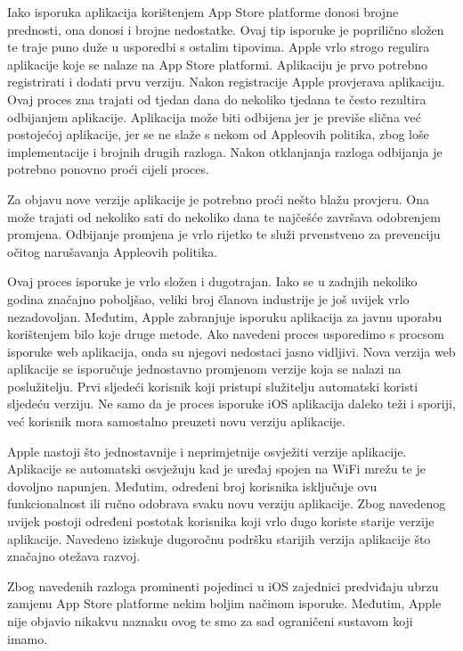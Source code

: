 \documentclass[times, utf8, diplomski, numeric]{fer}
\begin{document}
Iako isporuka aplikacija korištenjem App Store platforme donosi brojne prednosti, ona donosi i brojne nedostatke. Ovaj tip isporuke je poprilično složen te traje puno duže u usporedbi s ostalim tipovima. Apple vrlo strogo regulira aplikacije koje se nalaze na App Store platformi. Aplikaciju je prvo potrebno registrirati i dodati prvu verziju. Nakon registracije Apple provjerava aplikaciju. Ovaj proces zna trajati od tjedan dana do nekoliko tjedana te često rezultira odbijanjem aplikacije. Aplikacija može biti odbijena jer je previše slična već postojećoj aplikacije, jer se ne slaže s nekom od Appleovih politika, zbog loše implementacije i brojnih drugih razloga. Nakon otklanjanja razloga odbijanja je potrebno ponovno proći cijeli proces.

Za objavu nove verzije aplikacije je potrebno proći nešto blažu provjeru. Ona može trajati od nekoliko sati do nekoliko dana te najčešće završava odobrenjem promjena. Odbijanje promjena je vrlo rijetko te služi prvenstveno za prevenciju očitog narušavanja Appleovih politika.

Ovaj proces isporuke je vrlo složen i dugotrajan. Iako se u zadnjih nekoliko godina značajno poboljšao, veliki broj članova industrije je još uvijek vrlo nezadovoljan. Međutim, Apple zabranjuje isporuku aplikacija za javnu uporabu korištenjem bilo koje druge metode. Ako navedeni proces usporedimo s procsom isporuke web aplikacija, onda su njegovi nedostaci jasno vidljivi. Nova verzija web aplikacije se isporučuje jednostavno promjenom verzije koja se nalazi na poslužitelju. Prvi sljedeći korisnik koji pristupi služitelju automatski koristi sljedeću verziju. Ne samo da je proces isporuke iOS aplikacija daleko teži i sporiji, već korisnik mora samostalno preuzeti novu verziju aplikacije.

Apple nastoji što jednostavnije i neprimjetnije osvježiti verzije aplikacije. Aplikacije se automatski osvježuju kad je uređaj spojen na WiFi mrežu te je dovoljno napunjen. Međutim, određeni broj korisnika isključuje ovu funkcionalnost ili ručno odobrava svaku novu verziju aplikacije. Zbog navedenog uvijek postoji određeni postotak korisnika koji vrlo dugo koriste starije verzije aplikacije. Navedeno iziskuje dugoročnu podršku starijih verzija aplikacije što značajno otežava razvoj.

Zbog navedenih razloga prominenti pojedinci u iOS zajednici predviđaju ubrzu zamjenu App Store platforme nekim boljim načinom isporuke. Međutim, Apple nije objavio nikakvu naznaku ovog te smo za sad ograničeni sustavom koji imamo.
\end{document}
